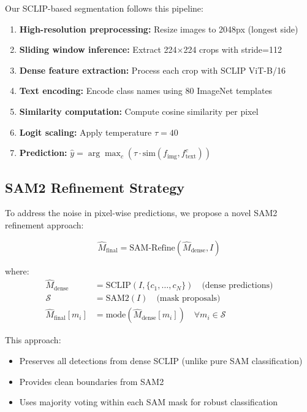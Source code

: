 Our SCLIP-based segmentation follows this pipeline:

\begin{enumerate}
    \item \textbf{High-resolution preprocessing:} Resize images to 2048px (longest side)
    \item \textbf{Sliding window inference:} Extract 224×224 crops with stride=112
    \item \textbf{Dense feature extraction:} Process each crop with SCLIP ViT-B/16
    \item \textbf{Text encoding:} Encode class names using 80 ImageNet templates
    \item \textbf{Similarity computation:} Compute cosine similarity per pixel
    \item \textbf{Logit scaling:} Apply temperature $\tau = 40$
    \item \textbf{Prediction:} $\hat{y} = \arg\max_c \left(\tau \cdot \text{sim}(f_{\text{img}}, f_{\text{text}}^c)\right)$
\end{enumerate}

\subsection{SAM2 Refinement Strategy}

To address the noise in pixel-wise predictions, we propose a novel SAM2 refinement approach:

\begin{equation}
\label{eq:sam_refinement}
\hat{M}_{\text{final}} = \text{SAM-Refine}(\hat{M}_{\text{dense}}, I)
\end{equation}

where:
\begin{align}
\hat{M}_{\text{dense}} &= \text{SCLIP}(I, \{c_1, \ldots, c_N\}) \quad \text{(dense predictions)} \\
\mathcal{S} &= \text{SAM2}(I) \quad \text{(mask proposals)} \\
\hat{M}_{\text{final}}[m_i] &= \text{mode}(\hat{M}_{\text{dense}}[m_i]) \quad \forall m_i \in \mathcal{S}
\end{align}

This approach:
\begin{itemize}
    \item Preserves all detections from dense SCLIP (unlike pure SAM classification)
    \item Provides clean boundaries from SAM2
    \item Uses majority voting within each SAM mask for robust classification
\end{itemize}

